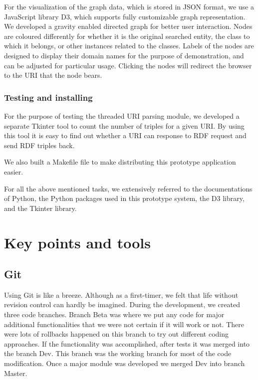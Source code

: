 \documentclass[12pt]{cls}
\begin{document}
For the visualization of the graph data, which is stored in JSON format, we use a JavaScript library D3, which supports fully customizable graph representation. We developed a gravity enabled directed graph for better user interaction. Nodes are coloured differently for whether it is the original searched entity, the class to which it belongs, or other instances related to the classes. Labels of the nodes are designed to display their domain names for the purpose of demonstration, and can be adjusted for particular usage. Clicking the nodes will redirect the browser to the URI that the node bears.

\subsection{Testing and installing}

For the purpose of testing the threaded URI parsing module, we developed a separate Tkinter tool to count the number of triples for a given URI. By using this tool it is easy to find out whether a URI can response to RDF request and send RDF triples back.

We also built a Makefile file to make distributing this prototype application easier.

For all the above mentioned tasks, we extensively referred to the documentations of Python, the Python packages used in this prototype system, the D3 library, and the Tkinter library.

\chapter{Key points and tools}

\section{Git}

Using Git is like a breeze. Although as a first-timer, we felt that life without revision control can hardly be imagined. During the development, we created three code branches. Branch Beta was where we put any code for major additional functionalities that we were not certain if it will work or not. There were lots of rollbacks happened on this branch to try out different coding approaches. If the functionality was accomplished, after tests it was merged into the branch Dev. This branch was the working branch for most of the code modification. Once a major module was developed we merged Dev into branch Master. 
\end{document}
